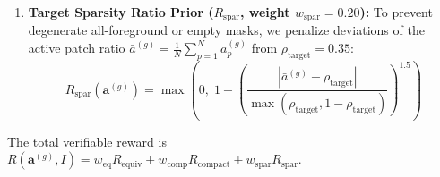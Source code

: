 \documentclass[11pt,a4paper]{article}
\begin{document}
\begin{enumerate}[leftmargin=*]
    \begin{align}
    S_{\text{NCut}}(\mathbf{a}^{(g)}) &= \frac{1}{2}\!\left(\frac{{\mathbf{a}^{(g)}}^\top \mathbf{W} \mathbf{a}^{(g)} - {\mathbf{a}^{(g)}}^\top \mathbf{W} (\mathbf{1} - \mathbf{a}^{(g)})}{{\mathbf{a}^{(g)}}^\top \mathbf{W} \mathbf{1} + \epsilon} + 1\right), \nonumber \\
    R_{\text{compact}}(\mathbf{a}^{(g)}) &= 0.65\,S_{\text{NCut}}(\mathbf{a}^{(g)}) + 0.35\,\left(1 - \tfrac{1}{2}(\text{TV}_H + \text{TV}_W)\right)
    \label{eq:reward_compact}
    \end{align}
    \item \textbf{Target Sparsity Ratio Prior ($R_{\text{spar}}$, weight $w_{\text{spar}} = 0.20$):} To prevent degenerate all-foreground or empty masks, we penalize deviations of the active patch ratio $\bar{a}^{(g)} = \frac{1}{N}\sum_{p=1}^N a_p^{(g)}$ from $\rho_{\text{target}} = 0.35$:
    \begin{equation}
    R_{\text{spar}}(\mathbf{a}^{(g)}) = \max\!\left(0,\; 1 - \left(\frac{|\bar{a}^{(g)} - \rho_{\text{target}}|}{\max(\rho_{\text{target}}, 1 - \rho_{\text{target}})}\right)^{1.5}\right)
    \label{eq:reward_sparsity}
    \end{equation}
\end{enumerate}
The total verifiable reward is $R(\mathbf{a}^{(g)}, I) = w_{\text{eq}} R_{\text{equiv}} + w_{\text{comp}} R_{\text{compact}} + w_{\text{spar}} R_{\text{spar}}$.
\end{document}
